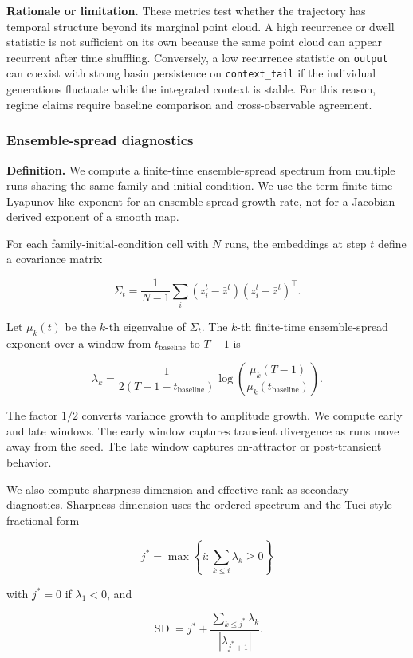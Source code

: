 \documentclass{article}
\theoremstyle{plain}
\theoremstyle{definition}
\begin{document}
\textbf{Rationale or limitation.} These metrics test whether the trajectory has temporal structure beyond its marginal point cloud. A high recurrence or dwell statistic is not sufficient on its own because the same point cloud can appear recurrent after time shuffling. Conversely, a low recurrence statistic on \texttt{output} can coexist with strong basin persistence on \texttt{context\_tail} if the individual generations fluctuate while the integrated context is stable. For this reason, regime claims require baseline comparison and cross-observable agreement.

\subsubsection{Ensemble-spread diagnostics}

\textbf{Definition.} We compute a finite-time ensemble-spread spectrum from multiple runs sharing the same family and initial condition. We use the term finite-time Lyapunov-like exponent for an ensemble-spread growth rate, not for a Jacobian-derived exponent of a smooth map.

For each family-initial-condition cell with \(N\) runs, the embeddings at step \(t\) define a covariance matrix

\[\Sigma_t=\frac{1}{N-1}\sum_i (z_i^t-\bar z^t)(z_i^t-\bar z^t)^\top .\]

Let \(\mu_k(t)\) be the \(k\)-th eigenvalue of \(\Sigma_t\). The \(k\)-th finite-time ensemble-spread exponent over a window from \(t_{\mathrm{baseline}}\) to \(T-1\) is

\[\lambda_k=
\frac{1}{2(T-1-t_{\mathrm{baseline}})}
\log\left(\frac{\mu_k(T-1)}{\mu_k(t_{\mathrm{baseline}})}\right).\]

The factor \(1/2\) converts variance growth to amplitude growth. We compute early and late windows. The early window captures transient divergence as runs move away from the seed. The late window captures on-attractor or post-transient behavior.

We also compute sharpness dimension and effective rank as secondary diagnostics. Sharpness dimension uses the ordered spectrum and the Tuci-style fractional form

\[j^*=\max\left\{i:\sum_{k\leq i}\lambda_k\geq0\right\}\]

with \(j^*=0\) if \(\lambda_1<0\), and

\[\operatorname{SD}=j^*+
\frac{\sum_{k\leq j^*}\lambda_k}{|\lambda_{j^*+1}|}.\]
\end{document}
